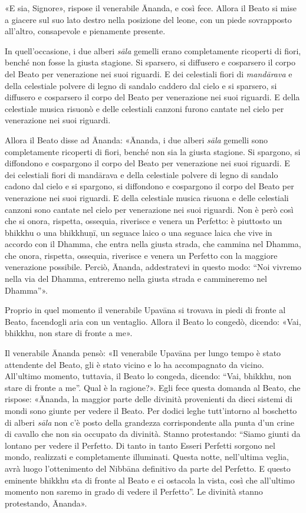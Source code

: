 «E sia, Signore», rispose il venerabile Ānanda, e così fece. Allora il Beato si
mise a giacere sul suo lato destro nella posizione del leone, con un piede
sovrapposto all’altro, consapevole e pienamente presente.

In quell’occasione, i due alberi \emph{sāla} gemelli erano completamente
ricoperti di fiori, benché non fosse la giusta stagione. Si sparsero, si
diffusero e cosparsero il corpo del Beato per venerazione nei suoi riguardi. E
dei celestiali fiori di \emph{mandārava} e della celestiale polvere di legno di
sandalo caddero dal cielo e si sparsero, si diffusero e cosparsero il corpo del
Beato per venerazione nei suoi riguardi. E della celestiale musica risuonò e
delle celestiali canzoni furono cantate nel cielo per venerazione nei suoi
riguardi.

Allora il Beato disse ad Ānanda: «Ānanda, i due alberi \emph{sāla} gemelli sono
completamente ricoperti di fiori, benché non sia la giusta stagione. Si
spargono, si diffondono e cospargono il corpo del Beato per venerazione nei suoi
riguardi. E dei celestiali fiori di mandārava e della celestiale polvere di
legno di sandalo cadono dal cielo e si spargono, si diffondono e cospargono il
corpo del Beato per venerazione nei suoi riguardi. E della celestiale musica
risuona e delle celestiali canzoni sono cantate nel cielo per venerazione nei
suoi riguardi. Non è però così che si onora, rispetta, ossequia, riverisce e
venera un Perfetto: è piuttosto un bhikkhu o una bhikkhuṇī, un seguace laico o
una seguace laica che vive in accordo con il Dhamma, che entra nella giusta
strada, che cammina nel Dhamma, che onora, rispetta, ossequia, riverisce e
venera un Perfetto con la maggiore venerazione possibile. Perciò, Ānanda,
addestratevi in questo modo: “Noi vivremo nella via del Dhamma, entreremo nella
giusta strada e cammineremo nel Dhamma”».

Proprio in quel momento il venerabile Upavāna si trovava in piedi di fronte al
Beato, facendogli aria con un ventaglio. Allora il Beato lo congedò, dicendo:
«Vai, bhikkhu, non stare di fronte a me».

Il venerabile Ānanda pensò: «Il venerabile Upavāna per lungo tempo è stato
attendente del Beato, gli è stato vicino e lo ha accompagnato da vicino.
All’ultimo momento, tuttavia, il Beato lo congeda, dicendo: “Vai, bhikkhu, non
stare di fronte a me”. Qual è la ragione?». Egli fece questa domanda al Beato,
che rispose: «Ānanda, la maggior parte delle divinità provenienti da dieci
sistemi di mondi sono giunte per vedere il Beato. Per dodici leghe tutt’intorno
al boschetto di alberi \emph{sāla} non c’è posto della grandezza corrispondente
alla punta d’un crine di cavallo che non sia occupato da divinità. Stanno
protestando: “Siamo giunti da lontano per vedere il Perfetto. Di tanto in tanto
Esseri Perfetti sorgono nel mondo, realizzati e completamente illuminati. Questa
notte, nell’ultima veglia, avrà luogo l’ottenimento del Nibbāna definitivo da
parte del Perfetto. E questo eminente bhikkhu sta di fronte al Beato e ci
ostacola la vista, così che all’ultimo momento non saremo in grado di vedere il
Perfetto”. Le divinità stanno protestando, Ānanda».

